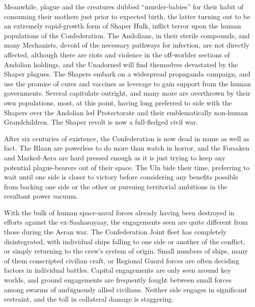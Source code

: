 Meanwhile, plague and the creatures dubbed “murder-babies” for their habit of consuming their mothers just prior to expected birth, the latter turning out to be an extremely rapid-growth form of Shaper Hulk, inflict terror upon the human populations of the Confederation. The Andolians, in their sterile compounds, and many Mechanists, devoid of the necessary pathways for infection, are not directly affected, although there are riots and violence in the off-worlder sections of Andolian holdings, and the Unadorned will find themselves devastated by the Shaper plagues. The Shapers embark on a widespread propaganda campaign, and use the promise of cures and vaccines as leverage to gain support from the human governments.  Several capitulate outright, and many more are overthrown by their own populations, most, at this point, having long preferred to side with the Shapers over the Andolian led Protectorate and their emblematically non-human Grandchildren. The Shaper revolt is now a full-fledged civil war.

After six centuries of existence, the Confederation is now dead in name as well as fact. The Rlaan are powerless to do more than watch in horror, and the Forsaken and Marked-Aera are hard pressed enough as it is just trying to keep any potential plague-bearers out of their space. The Uln bide their time, preferring to wait until one side is closer to victory before considering any benefits possible from backing one side or the other or pursuing territorial ambitions in the resultant power vacuum.

With the bulk of human space-naval forces already having been destroyed in efforts against the ex-Saahasayaay, the engagements seen are quite different from those during the Aeran war. The Confederation Joint fleet has completely disintegrated, with individual ships falling to one side or another of the conflict, or simply returning to the crew’s system of origin. Small numbers of ships, many of them conscripted civilian craft, or Regional Guard forces are often deciding factors in individual battles. Capital engagements are only seen around key worlds, and ground engagements are frequently fought between small forces among swarms of ambiguously allied civilians. Neither side engages in significant restraint, and the toll in collateral damage is staggering.

